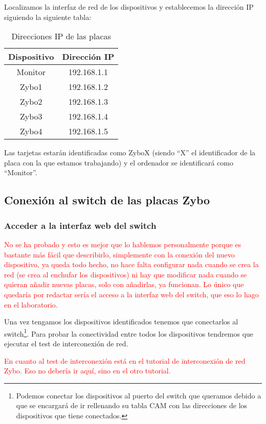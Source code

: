 \documentclass[12pt,letterpaper]{article}
\begin{document}
Localizamos la interfaz de red de los dispositivos y establecemos la dirección IP siguiendo la siguiente tabla:

\begin{table}[h]
	\centering
	\begin{tabular}{|c|c|}
		\hline
		\textbf{Dispositivo} & \textbf{Dirección IP} \\ \hline
		Monitor & 192.168.1.1 \\ \hline
		Zybo1 & 192.168.1.2 \\ \hline
		Zybo2 & 192.168.1.3 \\ \hline
		Zybo3 & 192.168.1.4 \\ \hline
		Zybo4 & 192.168.1.5 \\ \hline
	\end{tabular}
\caption{Direcciones IP de las placas}
\label{Direcciones}
\end{table}

Las tarjetas estarán identificadas como ZyboX (siendo ``X'' el identificador de la placa con la que estamos trabajando) y el ordenador se identificará como ``Monitor''.

\subsection{Conexión al switch de las placas Zybo}
\subsubsection{Acceder a la interfaz web del switch}
\textcolor{red}{No se ha probado y esto es mejor que lo hablemos personalmente porque es bastante más fácil que describirlo, simplemente con la conexión del nuevo dispositivo, ya queda todo hecho, no hace falta configurar nada cuando se crea la red (se crea al enchufar los dispositivos) ni hay que modificar nada cuando se quieran añadir nuevas placas, solo con añadirlas, ya funcionan. Lo único que quedaría por redactar sería el acceso a la interfaz web del switch, que eso lo hago en el laboratorio.}

Una vez tengamos los dispositivos identificados tenemos que conectarlos al switch\footnote{Podemos conectar los dispositivos al puerto del switch que queramos debido a que se encargará de ir rellenando su tabla CAM con las direcciones de los dispositivos que tiene conectados.}. Para probar la conectividad entre todos los dispositivos tendremos que ejecutar el test de interconexión de red.

\textcolor{red}{En cuanto al test de interconexión está en el tutorial de interconexión de red Zybo. Eso no debería ir aquí, sino en el otro tutorial.}
\end{document}
